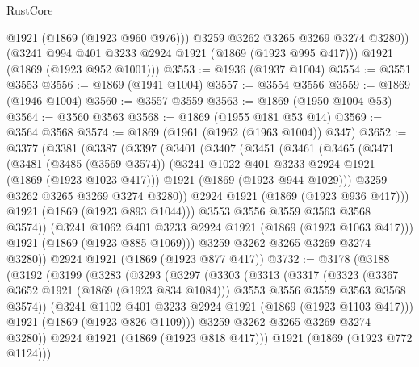 \begin{lexlean}{RustCore}
\begin{coremodule}
            @1921
            (@1869 (@1923 @960 @976)))
          @3259
          @3262
          @3265
          @3269
          @3274
          @3280))
      (@3241 @994 @401 @3233 @2924 @1921 (@1869 (@1923 @995 @417)))
      @1921
      (@1869 (@1923 @952 @1001)))
@3553 := @1936 (@1937 @1004)
@3554 := @3551 @3553
@3556 := @1869 (@1941 @1004)
@3557 := @3554 @3556
@3559 := @1869 (@1946 @1004)
@3560 := @3557 @3559
@3563 := @1869 (@1950 @1004 @53)
@3564 := @3560 @3563
@3568 := @1869 (@1955 @181 @53 @14)
@3569 := @3564 @3568
@3574 := @1869 (@1961 (@1962 (@1963 @1004)) @347)
@3652 := @3377
    (@3381
      (@3387
        (@3397
          (@3401
            (@3407
              (@3451
                (@3461
                  (@3465
                    (@3471
                      (@3481
                        (@3485 (@3569 @3574))
                        (@3241 @1022 @401 @3233 @2924 @1921 (@1869 (@1923 @1023 @417)))
                        @1921
                        (@1869 (@1923 @944 @1029)))
                      @3259
                      @3262
                      @3265
                      @3269
                      @3274
                      @3280))
                  @2924
                  @1921
                  (@1869 (@1923 @936 @417)))
                @1921
                (@1869 (@1923 @893 @1044)))
              @3553
              @3556
              @3559
              @3563
              @3568
              @3574))
          (@3241 @1062 @401 @3233 @2924 @1921 (@1869 (@1923 @1063 @417)))
          @1921
          (@1869 (@1923 @885 @1069)))
        @3259
        @3262
        @3265
        @3269
        @3274
        @3280))
    @2924
    @1921
    (@1869 (@1923 @877 @417))
@3732 := @3178
    (@3188
      (@3192
        (@3199
          (@3283
            (@3293
              (@3297
                (@3303
                  (@3313
                    (@3317
                      (@3323
                        (@3367 @3652 @1921 (@1869 (@1923 @834 @1084)))
                        @3553
                        @3556
                        @3559
                        @3563
                        @3568
                        @3574))
                    (@3241 @1102 @401 @3233 @2924 @1921 (@1869 (@1923 @1103 @417)))
                    @1921
                    (@1869 (@1923 @826 @1109)))
                  @3259
                  @3262
                  @3265
                  @3269
                  @3274
                  @3280))
              @2924
              @1921
              (@1869 (@1923 @818 @417)))
            @1921
            (@1869 (@1923 @772 @1124)))

\end{coremodule}
\end{lexlean}
